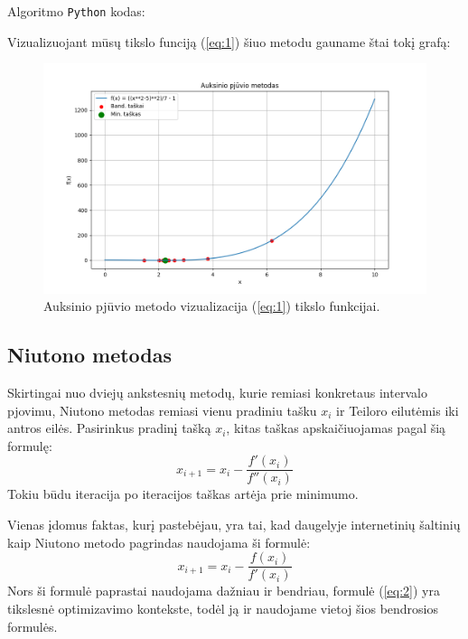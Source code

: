 \documentclass{article}
\begin{document}
Algoritmo \lstinline|Python| kodas:

Vizualizuojant mūsų tikslo funciją (\ref{eq:1}) šiuo metodu gauname štai tokį grafą:
\begin{figure}[H]
    \centering
    \includegraphics[width=1\textwidth]{Figure_2.png}
    \caption{Auksinio pjūvio metodo vizualizacija (\ref{eq:1}) tikslo funkcijai.}
    \label{fig:2}
\end{figure}
\subsection{Niutono metodas}
Skirtingai nuo dviejų ankstesnių metodų, kurie remiasi konkretaus intervalo pjovimu, Niutono metodas remiasi vienu pradiniu tašku $x_{i}$ ir Teiloro eilutėmis iki antros eilės. Pasirinkus pradinį tašką $x_{i}$, kitas taškas apskaičiuojamas pagal šią formulę:
\begin{equation}\label{eq:2}
    x_{i+1} = x_{i} - \frac{f'(x_{i})}{f''(x_{i})}
\end{equation}
Tokiu būdu iteracija po iteracijos taškas artėja prie minimumo.

Vienas įdomus faktas, kurį pastebėjau, yra tai, kad daugelyje internetinių šaltinių kaip Niutono metodo pagrindas naudojama ši formulė:
\begin{equation*}
    x_{i+1} = x_{i} - \frac{f(x_{i})}{f'(x_{i})}
\end{equation*}
Nors ši formulė paprastai naudojama dažniau ir bendriau, formulė (\ref{eq:2}) yra tikslesnė optimizavimo kontekste, todėl ją ir naudojame vietoj šios bendrosios formulės.
\end{document}
